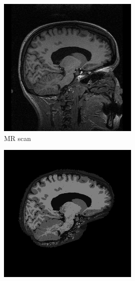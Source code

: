 \documentclass[10pt,twoside]{book}
\begin{document}
\begin{figure}
  \centering
  \begin{subfigure}[t]{0.3\textwidth}
    \centering
    \includegraphics[width=\textwidth]{biasFieldEstimationData}
    \caption{MR scan} 
  \end{subfigure}
  \hfill
  \begin{subfigure}[t]{0.3\textwidth}
    \centering
    \includegraphics[width=\textwidth]{biasFieldEstimationReconstruction}

\end{subfigure}
\end{figure}
\end{document}
